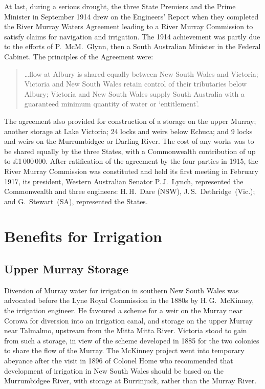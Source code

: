 At last, during a serious drought, the three State Premiers and the
Prime Minister in September 1914 drew on the Engineers' Report when
they completed the River Murray Waters Agreement leading to a River
Murray Commission to satisfy claims for navigation and irrigation. The
1914 achievement was partly due to the efforts of P.~McM.~Glynn, then
a South Australian Minister in the Federal Cabinet. The principles of the Agreement were:
\begin{quote}
	\ldots flow at Albury is shared equally between New South
	Wales and Victoria; Victoria and New South Wales retain
	control of their tributaries below Albury; Victoria and New
	South Wales supply South Australia with a guaranteed minimum
	quantity of water or `entitlement'.
\end{quote}

The agreement also provided for construction of a storage on the upper
Murray; another storage at Lake Victoria; 24 locks and weirs below
Echuca; and 9 locks and weirs on the Murrumbidgee or Darling River.
The cost of any works was to be shared equally by the three States,
with a Commonwealth contribution of up to \pounds1\,000\,000. After
ratification of the agreement by the four parties in 1915, the River
Murray Commission was constituted and held its first meeting in
February 1917, its president, Western Australian Senator P.\,J.~Lynch,
represented the Commonwealth and three engineers: H.\,H.~Dare (NSW),
J.\,S.~Dethridge~(Vic.); and G.~Stewart~(SA), represented the
States.

\section*{Benefits for Irrigation}

\subsection*{Upper Murray Storage}

Diversion of Murray water for irrigation in southern New South Wales
was advocated before the Lyne Royal Commission in the 1880s by
H.\,G.~McKinney, the irrigation engineer.  He favoured a scheme for a
weir on the Murray near Corowa for diversion into an irrigation canal,
and storage on the upper Murray near Talmalmo, upstream from the Mitta
Mitta River.  Victoria stood to gain from such a storage, in view of
the scheme developed in 1885 for the two colonies to share the flow of
the Murray.  The McKinney project went into temporary abeyance after
the visit in 1896 of Colonel Home who recommended that development of
irrigation in New South Wales should be based on the Murrumbidgee
River, with storage at Burrinjuck, rather than the Murray
River.

